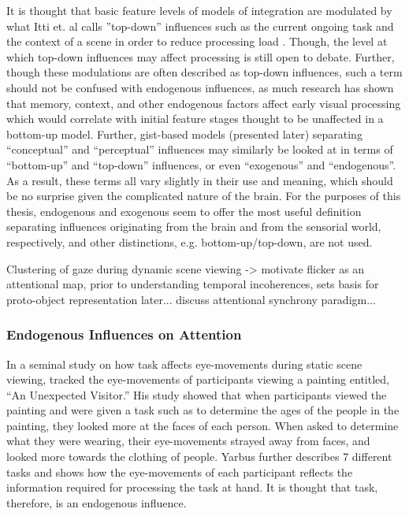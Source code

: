 It is thought that basic feature levels of models of integration are modulated by what Itti et. al calls ''top-down'' influences \cite{Itti2001} such as the current ongoing task \cite{Yarbus1967,Smith2011a} and the context of a scene in order to reduce processing load \cite{Henderson2003,Torralba2006}.  Though, the level at which top-down influences may affect processing is still open to debate.  Further, though these modulations are often described as top-down influences, such a term should not be confused with endogenous influences, as much research has shown that memory, context, and other endogenous factors affect early visual processing \cite{Tatler2011} which would correlate with initial feature stages thought to be unaffected in a bottom-up model.  Further, gist-based models (presented later) separating ``conceptual'' and ``perceptual'' influences may similarly be looked at in terms of ``bottom-up'' and ``top-down'' influences, or even ``exogenous'' and ``endogenous''.  As a result, these terms all vary slightly in their use and meaning, which should be no surprise given the complicated nature of the brain.  For the purposes of this thesis, endogenous and exogenous seem to offer the most useful definition separating influences originating from the brain and from the sensorial world, respectively, and other distinctions, e.g. bottom-up/top-down, are not used. 

Clustering of gaze during dynamic scene viewing -> motivate flicker as an attentional map, prior to understanding temporal incoherences, sets basis for proto-object representation later... discuss attentional synchrony paradigm... 
  	
\subsubsection{Endogenous Influences on Attention}
\label{sec:endogenous-influences}

In a seminal study on how task affects eye-movements during static scene viewing, \cite{Yarbus1967} tracked the eye-movements of participants viewing a painting entitled, ``An Unexpected Visitor.''  His study showed that when participants viewed the painting and were given a task such as to determine the ages of the people in the painting, they looked more at the faces of each person.  When asked to determine what they were wearing, their eye-movements strayed away from faces, and looked more towards the clothing of people.  Yarbus further describes 7 different tasks and shows how the eye-movements of each participant reflects the information required for processing the task at hand.  It is thought that task, therefore, is an endogenous influence.


